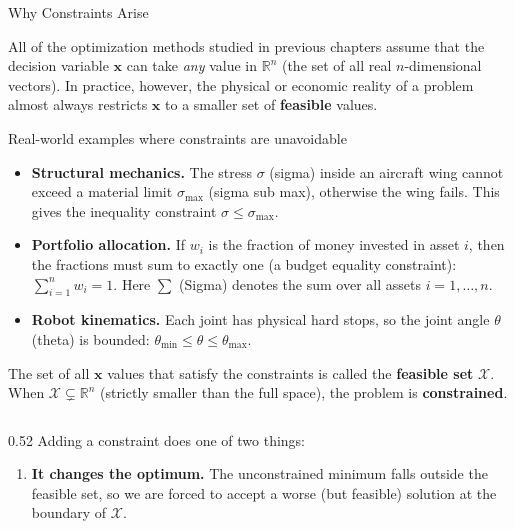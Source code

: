 \documentclass[aspectratio=169,10pt]{beamer}
\newcommand{\R}{\mathbb{R}}
\newcommand{\bx}{\mathbf{x}}
\begin{document}
\begin{frame}[allowframebreaks]{Why Constraints Arise}

  All of the optimization methods studied in previous chapters assume that the
  decision variable $\bx$ can take \emph{any} value in $\R^n$ (the set of all
  real $n$-dimensional vectors).  In practice, however, the physical or
  economic reality of a problem almost always restricts $\bx$ to a smaller set
  of \textbf{feasible} values.

  \begin{exampleblock}{Real-world examples where constraints are unavoidable}
    \begin{itemize}
      \item \textbf{Structural mechanics.}  The stress $\sigma$ (sigma) inside
            an aircraft wing cannot exceed a material limit
            $\sigma_{\max}$ (sigma sub max), otherwise the wing fails.
            This gives the inequality constraint $\sigma \le \sigma_{\max}$.

      \item \textbf{Portfolio allocation.}  If $w_i$ is the fraction of money
            invested in asset $i$, then the fractions must sum to exactly one
            (a budget equality constraint): $\sum_{i=1}^n w_i = 1$.  Here
            $\sum$ (Sigma) denotes the sum over all assets $i = 1, \ldots, n$.

      \item \textbf{Robot kinematics.}  Each joint has physical hard stops, so
            the joint angle $\theta$ (theta) is bounded:
            $\theta_{\min} \le \theta \le \theta_{\max}$.
    \end{itemize}
  \end{exampleblock}

  The set of all $\bx$ values that satisfy the constraints is called the
  \textbf{feasible set} $\mathcal{X}$.  When $\mathcal{X} \subsetneq \R^n$
  (strictly smaller than the full space), the problem is
  \textbf{constrained}.

  \framebreak

  \begin{columns}
    \begin{column}{0.52\textwidth}
      Adding a constraint does one of two things:

      \begin{enumerate}
        \item \textbf{It changes the optimum.}  The unconstrained minimum falls
              outside the feasible set, so we are forced to accept a worse (but
              feasible) solution at the boundary of $\mathcal{X}$.


\end{enumerate}
\end{column}
\end{columns}
\end{frame}
\end{document}
